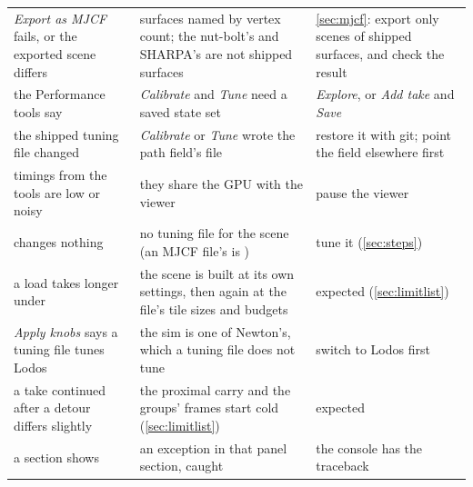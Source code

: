 \begin{longtable}{@{}L{44mm}L{50mm}L{59mm}@{}}
\emph{Export as MJCF} fails, or the exported scene differs & surfaces named by vertex count; the nut-bolt's and SHARPA's are not shipped surfaces & \cref{sec:mjcf}: export only scenes of shipped surfaces, and check the result \\
the Performance tools say  & \emph{Calibrate} and \emph{Tune} need a saved state set & \emph{Explore}, or \emph{Add take} and \emph{Save} \\
the shipped tuning file changed & \emph{Calibrate} or \emph{Tune} wrote the path field's file & restore it with git; point the field elsewhere first \\
timings from the tools are low or noisy & they share the GPU with the viewer & pause the viewer \\
 changes nothing & no tuning file for the scene (an MJCF file's is ) & tune it (\cref{sec:steps}) \\
a load takes longer under  & the scene is built at its own settings, then again at the file's tile sizes and budgets & expected (\cref{sec:limitlist}) \\
\emph{Apply knobs} says a tuning file tunes Lodos & the sim is one of Newton's, which a tuning file does not tune & switch to Lodos first \\
a take continued after a detour differs slightly & the proximal carry and the groups' frames start cold (\cref{sec:limitlist}) & expected \\
a section shows  & an exception in that panel section, caught & the console has the traceback \\
\bottomrule
\end{longtable}
\endgroup


